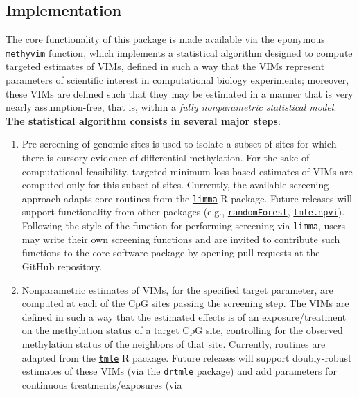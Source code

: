 \documentclass[9pt,a4paper,]{extarticle}
\theoremstyle{definition}
\theoremstyle{definition}
\theoremstyle{definition}
\theoremstyle{remark}
\begin{document}
\subsection{Implementation}\label{implementation}

The core functionality of this package is made available via the
eponymous \texttt{methyvim} function, which implements a statistical
algorithm designed to compute targeted estimates of VIMs, defined in
such a way that the VIMs represent parameters of scientific interest in
computational biology experiments; moreover, these VIMs are defined such
that they may be estimated in a manner that is very nearly
assumption-free, that is, within a \emph{fully nonparametric statistical
model}. \textbf{The statistical algorithm consists in several major
steps}:

\begin{enumerate}
\def\labelenumi{\arabic{enumi}.}
\item
  Pre-screening of genomic sites is used to isolate a subset of sites
  for which there is cursory evidence of differential methylation. For
  the sake of computational feasibility, targeted minimum loss-based
  estimates of VIMs are computed only for this subset of sites.
  Currently, the available screening approach adapts core routines from
  the \href{http://bioconductor.org/packages/limma}{\texttt{limma}} R
  package. Future releases will support functionality from other
  packages (e.g.,
  \href{https://CRAN.R-project.org/package=randomForest}{\texttt{randomForest}},
  \href{https://CRAN.R-project.org/package=tmle.npvi}{\texttt{tmle.npvi}}).
  Following the style of the function for performing screening via
  \texttt{limma}, users may write their own screening functions and are
  invited to contribute such functions to the core software package by
  opening pull requests at the GitHub repository.
\item
  Nonparametric estimates of VIMs, for the specified target parameter,
  are computed at each of the CpG sites passing the screening step. The
  VIMs are defined in such a way that the estimated effects is of an
  exposure/treatment on the methylation status of a target CpG site,
  controlling for the observed methylation status of the neighbors of
  that site. Currently, routines are adapted from the
  \href{https://CRAN.R-project.org/package=tmle}{\texttt{tmle}} R
  package. Future releases will support doubly-robust estimates of these
  VIMs (via the
  \href{https://cran.r-project.org/package=drtmle}{\texttt{drtmle}}
  package) and add parameters for continuous treatments/exposures (via

\end{enumerate}
\end{document}
